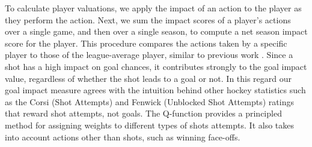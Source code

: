 \documentclass[runningheads,a4paper]{llncs}
\begin{document}
To calculate player valuations, we apply the impact of an action to the player as they perform the action.
Next, we sum the impact scores of a player's actions over a single game, and then over a single season, to compute a net season impact score for the player. This procedure compares the actions taken by a specific player to those of the league-average player, similar to previous work \cite{Pettigrew2015,Cervone2014a}. Since a shot has a high impact on goal chances, it contributes strongly to the goal impact value, regardless of whether the shot leads to a goal or not. In this regard our goal impact measure agrees with the intuition behind other hockey statistics such as the Corsi (Shot Attempts) and Fenwick (Unblocked Shot Attempts) ratings that reward shot attempts, not goals. The Q-function provides a principled method for assigning weights to different types of shots attempts. It also takes into account actions other than shots, such as winning face-offs.
\end{document}
